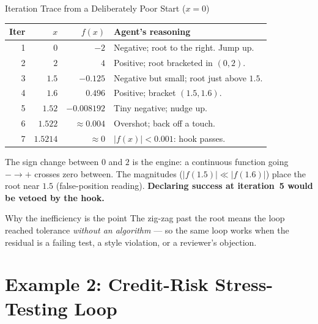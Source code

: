 \documentclass[9pt,t]{beamer}
\begin{document}
\begin{frame}{Iteration Trace from a Deliberately Poor Start ($x=0$)}

\begin{table}
\centering
\begin{tabular}{@{}rrrl@{}}
\toprule
Iter & $x$ & $f(x)$ & Agent's reasoning \\
\midrule
1 & $0$      & $-2$        & Negative; root to the right. Jump up. \\
2 & $2$      & $4$         & Positive; root bracketed in $(0,2)$. \\
3 & $1.5$    & $-0.125$    & Negative but small; root just above $1.5$. \\
4 & $1.6$    & $0.496$     & Positive; bracket $(1.5,1.6)$. \\
5 & $1.52$   & $-0.008192$ & Tiny negative; nudge up. \\
6 & $1.522$  & $\approx 0.004$ & Overshot; back off a touch. \\
7 & $1.5214$ & $\approx 0$ & $|f(x)|<0.001$: hook passes. \\
\bottomrule
\end{tabular}
\end{table}

\smallskip
The \alert{sign change} between $0$ and $2$ is the engine: a continuous function
going $-\to+$ crosses zero between. The magnitudes ($|f(1.5)|\ll|f(1.6)|$) place
the root near $1.5$ (false-position reading). \textbf{Declaring success at
iteration~5 would be vetoed by the hook.}

\medskip
\begin{block}{Why the inefficiency is the point}
The zig-zag past the root means the loop reached tolerance \emph{without an
algorithm} --- so the same loop works when the residual is a failing test, a
style violation, or a reviewer's objection.
\end{block}
\end{frame}

\section{Example 2: Credit-Risk Stress-Testing Loop}
\end{document}
